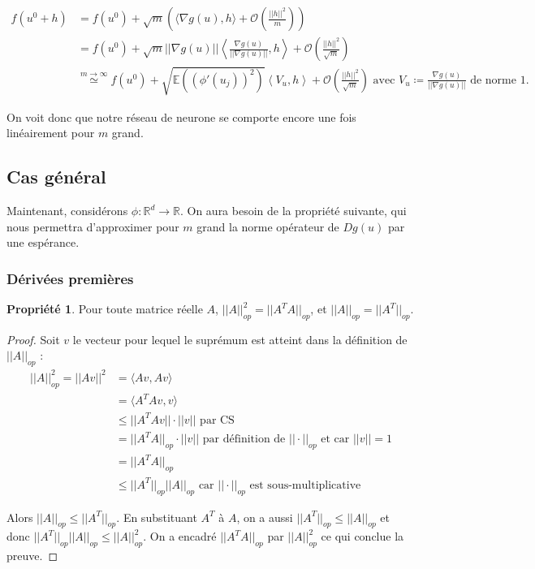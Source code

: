 \documentclass[a4paper, 11pt, french]{article}
\theoremstyle{definition}
\newtheorem{property}{Propriété}
\begin{document}
	\begin{align*}
		f(u^0 + h) &= f(u^0) + \sqrt m \left(\langle \nabla g(u), h \rangle + \mathcal{O}\left(\frac{||h||^2}{m}\right) \right) \\
		&= f(u^0) + \sqrt m ||\nabla g(u)|| \left \langle \frac{\nabla g(u)}{||\nabla g(u)||}, h \right \rangle  + \mathcal{O}\left(\frac{||h||^2}{\sqrt m}\right) \\
		&\stackrel{m \to \infty}{\simeq} f(u^0) + \sqrt{\mathbb{E}((\phi '(u_j))^2)} \left \langle V_u, h \right \rangle  + \mathcal{O}\left(\frac{||h||^2}{\sqrt m}\right) \text{ avec $V_u \coloneqq \frac{\nabla g(u)}{||\nabla g(u)||}$ de norme 1.}
	\end{align*}
	
	On voit donc que notre réseau de neurone se comporte encore une fois linéairement pour $m$ grand. \\
	
	\subsection{Cas général}
	
	Maintenant, considérons $\phi : \mathbb{R}^d \to \mathbb{R}$. On aura besoin de la propriété suivante, qui nous permettra d'approximer pour $m$ grand la norme opérateur de $D g(u)$ par une espérance.
	
	\subsubsection{Dérivées premières}
	
	\begin{property}
		Pour toute matrice réelle $A$, $||A||_{op}^2 = ||A^T A||_{op}$, et $||A||_{op} = ||A^T||_{op}$.
	\end{property}
	\begin{proof}
		Soit $v$ le vecteur pour lequel le suprémum est atteint dans la définition de $||A||_{op}$ :
		\begin{align*}
			||A||_{op}^2 = ||Av||^2 &= \langle Av, Av \rangle \\
			&= \langle A^T Av, v \rangle \\
			&\leq ||A^T Av|| \cdot ||v|| \text{ par CS}\\
			&= ||A^T A||_{op} \cdot ||v|| \text{ par définition de $||\cdot||_{op}$ et car $||v|| = 1$}\\
			&= ||A^T A||_{op} \\
			&\leq ||A^T||_{op} ||A||_{op} \text{ car $||\cdot||_{op}$ est sous-multiplicative}
		\end{align*}
		
		Alors $||A||_{op} \leq ||A^T||_{op}$. En substituant $A^T$ à $A$, on a aussi $||A^T||_{op} \leq ||A||_{op}$ et donc $||A^T||_{op} ||A||_{op} \leq ||A||_{op}^2$. On a encadré $||A^T A||_{op}$ par $||A||_{op}^2$ ce qui conclue la preuve.
	\end{proof}
\end{document}
